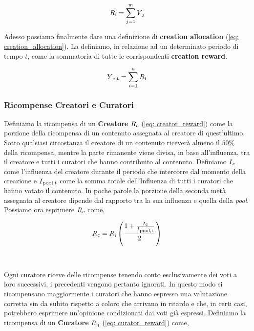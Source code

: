 \begin{equation}\label{eq: content_value}
    R\textsubscript{i} = \sum\limits_{j=1}^m V\textsubscript{j}
\end{equation}


Adesso possiamo finalmente dare una definizione di \textbf{creation allocation} (\ref{eq: creation_allocation}). La definiamo, in relazione ad un determinato periodo di tempo $t$, come la sommatoria di tutte le corrispondenti \textbf{creation reward}.


\begin{equation}\label{eq: creation_allocation}
    Y\textsubscript{c,t} = \sum\limits_{i=1}^n R\textsubscript{i}
\end{equation}

\subsubsection{Ricompense Creatori e Curatori}
Definiamo la ricompensa di un \textbf{Creatore} $R\textsubscript{c}$ (\ref{eq: creator_reward}) come la porzione della ricompensa di un contenuto assegnata al creatore di quest'ultimo.
Sotto qualsiasi circostanza il creatore di un contenuto riceverà almeno il $50\%$ della ricompensa, mentre la parte rimanente viene divisa, in base all'influenza, tra il creatore e tutti i curatori che hanno contribuito al contenuto.
Definiamo $I\textsubscript{c}$ come l'influenza del creatore durante il periodo che intercorre dal momento della creazione e $I\textsubscript{pool,t}$ come la somma totale dell'Influenza di tutti i curatori che hanno votato il contenuto. In poche parole la porzione della seconda metà assegnata al creatore dipende dal rapporto tra la sua influenza e quella della \textit{pool}.
Possiamo ora esprimere $R\textsubscript{c}$ come,


\begin{equation}\label{eq: creator_reward}
    R\textsubscript{c} = R\textsubscript{i}\left(\frac{1 + \frac{I\textsubscript{c}}{I\textsubscript{pool,t}}}{2}\right)
\end{equation}
\\
\\
Ogni curatore riceve delle ricompense tenendo conto esclusivamente dei voti a loro successivi, i precedenti vengono pertanto ignorati. In questo modo si ricompensano maggiormente i curatori che hanno espresso una valutazione corretta sin da subito rispetto a coloro che arrivano in ritardo e che, in certi casi, potrebbero esprimere un'opinione condizionati dai voti già espressi. 
Definiamo la ricompensa di un \textbf{Curatore} $R\textsubscript{q}$ (\ref{eq: curator_reward}) come,

